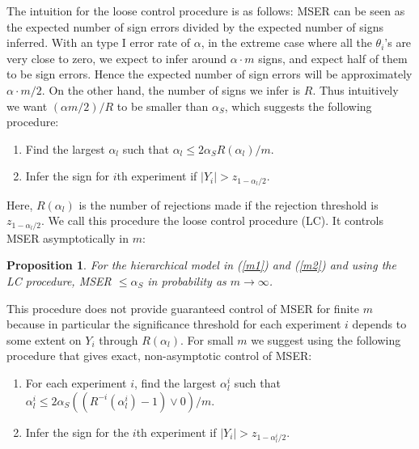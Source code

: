 \documentclass[11pt]{article}
\newtheorem{proposition}{Proposition}[section]
\begin{document}
The intuition for the loose control procedure is as follows: MSER can be seen as the expected number of sign errors divided by the expected number of signs inferred. With an type I error rate of $\alpha$, in the extreme case where all the $\theta_i$'s are very close to zero, we expect to infer around $\alpha \cdot m$ signs, and expect half of them to be sign errors. Hence the expected number of sign errors will be approximately $\alpha\cdot m/2$. On the other hand, the number of signs we infer is $R$. Thus intuitively we want $(\alpha m/2)/R$ to be smaller than $\alpha_S$, which suggests the following procedure: 
\begin{enumerate}
\item Find the largest $\alpha_{l}$ such that $\alpha_{l} \leq 2\alpha_SR(\alpha_{l})/m.$  
\item Infer the sign for $i$th experiment if $|Y_i|> z_{1-\alpha_{l}/2}$. 
\end{enumerate} 
Here, $R(\alpha_l)$ is the number of rejections made if the 
rejection threshold is $z_{1-\alpha_l/2}$. 
We call this procedure the loose control procedure (LC). It controls MSER asymptotically in $m$: 
\begin{proposition} 
For the hierarchical model in  (\ref{m1}) and (\ref{m2}) and using the LC 
procedure, 
MSER $\leq  \alpha_S$ in probability as 
$m\rightarrow \infty$. 
	\label{prop:lc}
\end{proposition}
This procedure does not provide guaranteed control of MSER for finite 
$m$ because in particular the significance threshold for each experiment 
$i$ depends to some extent on $Y_i$ through $R(\alpha_l)$. 
For small $m$ we suggest using the following procedure 
that gives exact, non-asymptotic control of MSER:
\begin{enumerate}
\item For each experiment $i$, find the largest $\alpha_{l}^i$ such that  
  $\alpha_{l}^i \leq 2\alpha_S( (R^{-i}(\alpha_{l}^i)-1)\vee 0)/m$. 
\item Infer the sign for the 
$i$th experiment if $|Y_i|> z_{1-\alpha^i_{l}/2}$.  
\end{enumerate}
\end{document}
